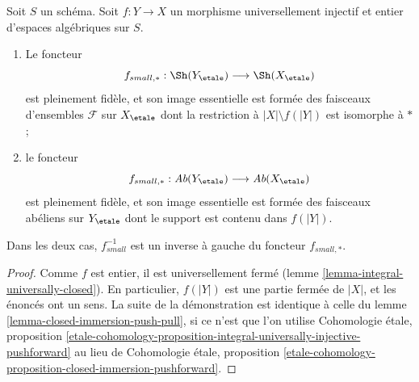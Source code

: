 \begin{lemma}
\label{lemma-integral-universally-injective-push-pull}
Soit $S$ un schéma. Soit $f : Y \to X$ un morphisme universellement injectif
et entier d'espaces algébriques sur $S$.
\begin{enumerate}
\item Le foncteur
$$
f_{small, *} : \Sh(Y_\etale) \longrightarrow \Sh(X_\etale)
$$
est pleinement fidèle, et son image essentielle est formée des faisceaux d'ensembles
$\mathcal{F}$ sur $X_\etale$ dont la restriction à $|X| \setminus f(|Y|)$
est isomorphe à $*$ ;
\item le foncteur
$$
f_{small, *} : \textit{Ab}(Y_\etale) \longrightarrow \textit{Ab}(X_\etale)
$$
est pleinement fidèle, et son image essentielle est formée des faisceaux abéliens sur
$Y_\etale$ dont le support est contenu dans $f(|Y|)$.
\end{enumerate}
Dans les deux cas, $f_{small}^{-1}$ est un inverse à gauche du foncteur $f_{small, *}$.
\end{lemma}

\begin{proof}
Comme $f$ est entier, il est universellement fermé
(lemme \ref{lemma-integral-universally-closed}).
En particulier, $f(|Y|)$ est une partie fermée de $|X|$,
et les énoncés ont un sens.
La suite de la démonstration est identique à celle du
lemme \ref{lemma-closed-immersion-push-pull},
si ce n'est que l'on utilise
Cohomologie étale, proposition
\ref{etale-cohomology-proposition-integral-universally-injective-pushforward}
au lieu de
Cohomologie étale, proposition
\ref{etale-cohomology-proposition-closed-immersion-pushforward}.
\end{proof}





























